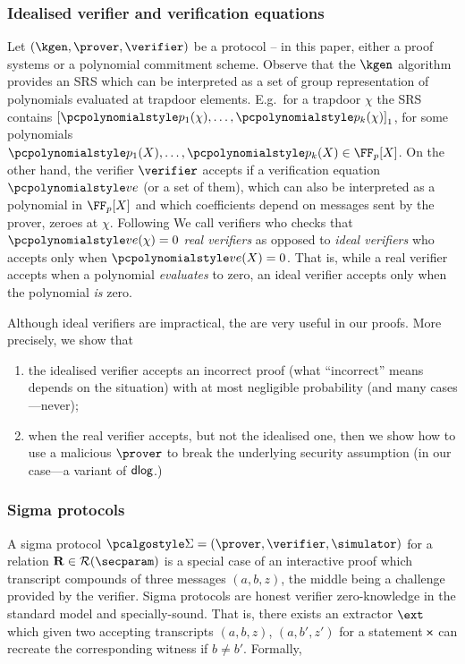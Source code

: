 \documentclass[runningheads,10pt]{llncs}
\begin{document}
\subsubsection{Idealised verifier and verification equations}
Let $(\kgen, \prover, \verifier)$ be a protocol -- in this paper, either a proof
systems or a polynomial commitment scheme. Observe that the $\kgen$ algorithm
provides an SRS which can be interpreted as a set of group representation of
polynomials evaluated at trapdoor elements. E.g.~for a trapdoor $\chi$ the SRS
contains $\gone{\p{p_1}(\chi), \ldots, \p{p_k}(\chi)}$, for some polynomials
$\p{p_1}(X), \ldots, \p{p_k}(X) \in \FF_p[X]$. On the other hand, the verifier
$\verifier$ accepts if a verification equation $\vereq$ (or a set of them),
which can also be interpreted as a polynomial in $\FF_p[X]$ and which
coefficients depend on messages sent by the prover, zeroes at $\chi$. Following
\cite{EPRINT:GabWilCio19} We call verifiers who checks that $\vereq(\chi) = 0$
\emph{real verifiers} as opposed to \emph{ideal verifiers} who accepts only when
$\vereq(X) = 0$. That is, while a real verifier accepts when a polynomial
\emph{evaluates} to zero, an ideal verifier accepts only when the polynomial
\emph{is} zero.

Although ideal verifiers are impractical, the are very useful in our
proofs. More precisely, we show that
\begin{enumerate}[(1)]
\item the idealised verifier accepts an incorrect proof (what ``incorrect''
  means depends on the situation) with at most negligible probability (and many
  cases---never);
\item when the real verifier accepts, but not the idealised one, then we show
  how to use a malicious $\prover$ to break the underlying security assumption
  (in our case---a variant of $\mathsf{dlog}$.)
\end{enumerate}

\subsubsection{Sigma protocols}
A sigma protocol $\sigmaprot = (\prover, \verifier, \simulator)$ for a relation
$\REL \in \RELGEN(\secparam)$ is a special case of an interactive proof which
transcript compounds of three messages $(a, b, z)$, the middle being a challenge
provided by the verifier. Sigma protocols are honest verifier zero-knowledge in
the standard model and specially-sound. That is, there exists an extractor
$\ext$ which given two accepting transcripts $(a, b, z)$, $(a, b', z')$ for a
statement $\mathsf{x}$ can recreate the corresponding witness if $b \neq b'$.
Formally,
\end{document}
